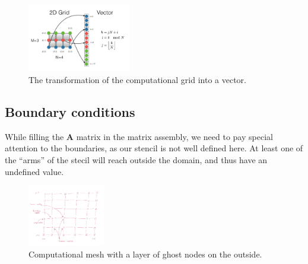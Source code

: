 \documentclass[acmtog]{acmart}
\begin{document}
\begin{figure}[H]
  \centering
  \includegraphics[width=0.4\textwidth]{Images/grid_to_vector.png}
  \caption{The transformation of the computational grid into a vector.}
  \Description{}
\end{figure}

\subsection{Boundary conditions}
While filling the $\boldsymbol A$ matrix in the matrix assembly, we need to pay
special attention to the boundaries, as our stencil is not well defined here.
At least one of the ``arms'' of the stecil will reach outside the domain, and
thus have an undefined value.

\begin{figure}[H]
  \centering
  \includegraphics[width=0.3\textwidth]{Images/ghost_nodes.png}
  \caption{Computational mesh with a layer of ghost nodes on the outside.}
  \Description{}
\end{figure}
\end{document}
